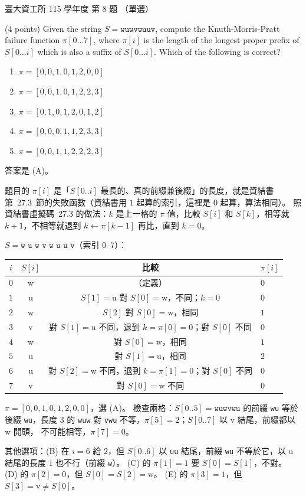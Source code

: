 \begin{pastexam}[label={px:ntu-115-dsa-08}]{臺大資工所 115 學年度 第 8 題}
（單選）

(4 points) Given the string $S=\texttt{wuwvwuuv}$, compute the Knuth-Morris-Pratt failure function $\pi[0\ldots 7]$, where $\pi[i]$ is the length of the longest proper prefix of $S[0\ldots i]$ which is also a suffix of $S[0\ldots i]$. Which of the following is correct?
\begin{enumerate}[label=(\Alph*)]
\item $\pi=[0,0,1,0,1,2,0,0]$
\item $\pi=[0,0,1,0,1,2,2,3]$
\item $\pi=[0,1,0,1,2,0,1,2]$
\item $\pi=[0,0,0,1,1,2,3,3]$
\item $\pi=[0,0,1,1,2,2,2,3]$
\end{enumerate}
\end{pastexam}

\begin{pastsoln}
答案是 (A)。

題目的 $\pi[i]$ 是「$S[0..i]$ 最長的、真的前綴兼後綴」的長度，就是資結書第~27.3~節的失敗函數（資結書用
$1$ 起算的索引，這裡是 $0$ 起算，算法相同）。 照資結書虛擬碼~27.3 的做法：$k$ 是上一格的 $\pi$ 值，比較
$S[i]$ 和 $S[k]$，相等就 $k + 1$，不相等就退到 $k \gets \pi[k-1]$ 再比，直到 $k = 0$。

$S = \texttt{w u w v w u u v}$（索引 $0$--$7$）：
\begin{center}
\begin{tabular}{cccl}
\toprule
$i$ & $S[i]$ & 比較 & $\pi[i]$ \\
\midrule
$0$ & w & （定義） & $0$ \\
$1$ & u & $S[1] = \text{u}$ 對 $S[0] = \text{w}$，不同；$k = 0$ & $0$ \\
$2$ & w & $S[2]$ 對 $S[0] = \text{w}$，相同 & $1$ \\
$3$ & v & 對 $S[1] = \text{u}$ 不同，退到 $k = \pi[0] = 0$；對 $S[0]$ 不同 & $0$ \\
$4$ & w & 對 $S[0] = \text{w}$，相同 & $1$ \\
$5$ & u & 對 $S[1] = \text{u}$，相同 & $2$ \\
$6$ & u & 對 $S[2] = \text{w}$ 不同，退到 $k = \pi[1] = 0$；對 $S[0]$ 不同 & $0$ \\
$7$ & v & 對 $S[0] = \text{w}$ 不同 & $0$ \\
\bottomrule
\end{tabular}
\end{center}
$\pi = [0, 0, 1, 0, 1, 2, 0, 0]$，選 (A)。 檢查兩格：$S[0..5] = \texttt{wuwvwu}$ 的前綴 \texttt{wu} 等於後綴
\texttt{wu}，長度 $3$ 的 \texttt{wuw} 對 \texttt{vwu} 不等，$\pi[5] = 2$；$S[0..7]$ 以 v 結尾，前綴都以 w 開頭，
不可能相等，$\pi[7] = 0$。

其他選項：(B) 在 $i = 6$ 給 $2$，但 $S[0..6]$ 以 \texttt{uu} 結尾，前綴 \texttt{wu} 不等於它，以 u 結尾的長度
$1$ 也不行（前綴 \texttt{w}）。 (C) 的 $\pi[1] = 1$ 要 $S[0] = S[1]$，不對。 (D) 的 $\pi[2] = 0$，但
$S[0] = S[2] = \text{w}$。 (E) 的 $\pi[3] = 1$，但 $S[3] = \text{v} \ne S[0]$。
\end{pastsoln}
